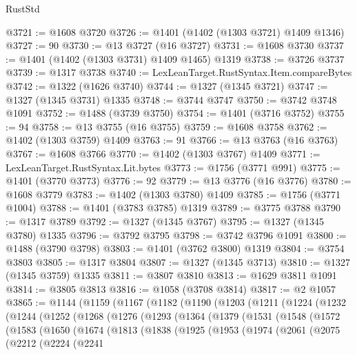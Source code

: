 \begin{lexlean}{RustStd}
\begin{coremodule}
@3721 := @1608 @3720
@3726 := @1401 (@1402 (@1303 @3721) @1409 @1346)
@3727 := 90
@3730 := @13 @3727 (@16 @3727)
@3731 := @1608 @3730
@3737 := @1401 (@1402 (@1303 @3731) @1409 @1465) @1319
@3738 := @3726 @3737
@3739 := @1317 @3738
@3740 := LexLeanTarget.RustSyntax.Item.compareBytes
@3742 := @1322 (@1626 @3740)
@3744 := @1327 (@1345 @3721)
@3747 := @1327 (@1345 @3731) @1335
@3748 := @3744 @3747
@3750 := @3742 @3748 @1091
@3752 := @1488 (@3739 @3750)
@3754 := @1401 (@3716 @3752)
@3755 := 94
@3758 := @13 @3755 (@16 @3755)
@3759 := @1608 @3758
@3762 := @1402 (@1303 @3759) @1409
@3763 := 91
@3766 := @13 @3763 (@16 @3763)
@3767 := @1608 @3766
@3770 := @1402 (@1303 @3767) @1409
@3771 := LexLeanTarget.RustSyntax.Lit.bytes
@3773 := @1756 (@3771 @991)
@3775 := @1401 (@3770 @3773)
@3776 := 92
@3779 := @13 @3776 (@16 @3776)
@3780 := @1608 @3779
@3783 := @1402 (@1303 @3780) @1409
@3785 := @1756 (@3771 @1004)
@3788 := @1401 (@3783 @3785) @1319
@3789 := @3775 @3788
@3790 := @1317 @3789
@3792 := @1327 (@1345 @3767)
@3795 := @1327 (@1345 @3780) @1335
@3796 := @3792 @3795
@3798 := @3742 @3796 @1091
@3800 := @1488 (@3790 @3798)
@3803 := @1401 (@3762 @3800) @1319
@3804 := @3754 @3803
@3805 := @1317 @3804
@3807 := @1327 (@1345 @3713)
@3810 := @1327 (@1345 @3759) @1335
@3811 := @3807 @3810
@3813 := @1629 @3811 @1091
@3814 := @3805 @3813
@3816 := @1058 (@3708 @3814)
@3817 := @2 @1057
@3865 := @1144
    (@1159
      (@1167
        (@1182
          (@1190
            (@1203
              (@1211
                (@1224
                  (@1232
                    (@1244
                      (@1252
                        (@1268
                          (@1276
                            (@1293
                              (@1364
                                (@1379
                                  (@1531
                                    (@1548
                                      (@1572
                                        (@1583
                                          (@1650
                                            (@1674
                                              (@1813
                                                (@1838
                                                  (@1925
                                                    (@1953
                                                      (@1974
                                                        (@2061
                                                          (@2075
                                                            (@2212
                                                              (@2224
                                                                (@2241

\end{coremodule}
\end{lexlean}
